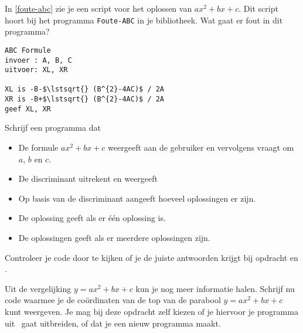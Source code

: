 \opdracht[3]In \autoref{foute-abc} zie je een script voor het oplossen van $ax^2+bx+c$. Dit script hoort bij het programma \texttt{Foute-ABC} in je bibliotheek. Wat gaat er fout in dit programma? 

\begin{lstlisting}[language=pseudo, rulesepcolor=\color{opdrachtkleur}, caption={Script van het programma \texttt{Foute-ABC.}}, label={foute-abc}]
ABC Formule
invoer : A, B, C
uitvoer: XL, XR

XL is -B-$\lstsqrt{} (B^{2}-4AC)$ / 2A
XR is -B+$\lstsqrt{} (B^{2}-4AC)$ / 2A
geef XL, XR
\end{lstlisting}

\opdracht[3] \label{abc-formule}%
\? Schrijf een programma dat
\begin{itemize}
	\item De formule $ax^{2}+bx+c$ weergeeft aan de gebruiker en vervolgens vraagt om $a$, $b$ en $c$.
	\item De discriminant uitrekent en weergeeft
	\item Op basis van de discriminant aangeeft hoeveel oplossingen er zijn.
	\item De oplossing geeft als er \'e\'en oplossing is.
	\item De oplossingen geeft als er meerdere oplossingen zijn.
\end{itemize}
\? Controleer je code door te kijken of je de juiste antwoorden krijgt bij opdracht  en .

\opdracht[4] Uit de vergelijking $y=ax^2+bx+c$ kun je nog meer informatie halen. Schrijf nu code waarmee je de co\"ordinaten van de top van de parabool $y=ax^2+bx+c$ kunt weergeven. Je mag bij deze opdracht  zelf kiezen of je hiervoor je programma uit \  gaat uitbreiden, of dat je een nieuw programma maakt.


